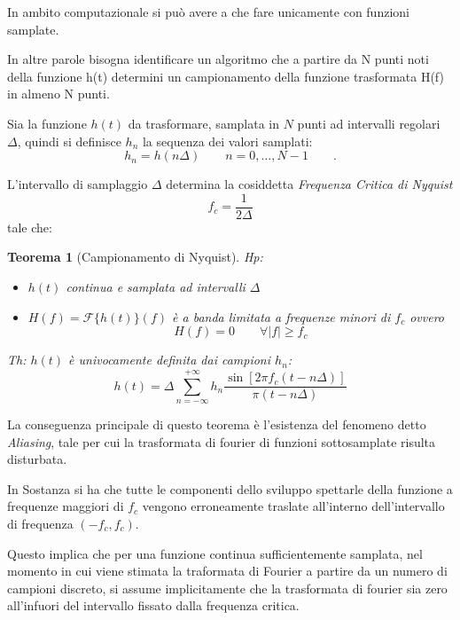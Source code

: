 \documentclass[13pt]{article}
\newtheorem{legge}{Teorema}
\begin{document}
In ambito computazionale si può avere a che fare unicamente con funzioni samplate.

In altre parole bisogna identificare un algoritmo che a partire da N punti noti della funzione h(t) determini un campionamento della funzione trasformata H(f) in almeno N punti.

Sia la funzione $h(t)$ da trasformare, samplata in $N$ punti ad intervalli regolari $\Delta$, quindi si definisce $h_{n}$ la sequenza dei valori samplati:
$$ h_{n} = h ( n \Delta ) \qquad n = 0, \ldots , N-1 \qquad .$$

L'intervallo di samplaggio $\Delta$ determina la cosiddetta \emph{Frequenza Critica di Nyquist}
	\begin{equation}
	f_{c} = \dfrac{1}{2 \Delta}
	\end{equation}
tale che:
\begin{legge}[Campionamento di Nyquist]

Hp:	\begin{itemize}
	\item[-] $h(t)$ continua e samplata ad intervalli $\Delta$
	\item[-] $H(f) = \mathcal{F}\lbrace h(t) \rbrace (f)$ è a banda limitata a frequenze minori di $f_{c}$ ovvero $$H(f) = 0 \qquad \forall \vert f \vert \geq f_{c}$$
	\end{itemize}

Th: $h(t)$ è univocamente definita dai campioni $h_{n}$:
\begin{equation}
h(t) = \Delta \sum_{n= - \infty}^{+ \infty} h_{n} \dfrac{\sin[2 \pi f_{c} (t - n \Delta)]}{\pi (t - n \Delta)}
\end{equation}
\end{legge}

La conseguenza principale di questo teorema è l'esistenza del fenomeno detto \emph{Aliasing}, tale per cui la trasformata di fourier di funzioni sottosamplate risulta disturbata.

In Sostanza si ha che tutte le componenti dello sviluppo spettarle della funzione a frequenze maggiori di $f_{c}$ vengono erroneamente traslate all'interno dell'intervallo di frequenza $(- f_{c} , f_{c})$.

Questo implica che per una funzione continua sufficientemente samplata, nel momento in cui viene stimata la traformata di Fourier a partire da un numero di campioni discreto, si assume implicitamente che la trasformata di fourier sia zero all'infuori del intervallo fissato dalla frequenza critica.
\end{document}
